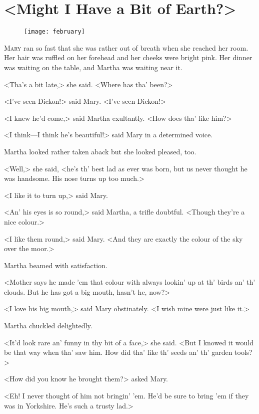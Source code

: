 \chapter{<Might I Have a Bit of Earth?>} 
	
\begin{figure}[t!]
\centering
\texttt{[image: february]}
\end{figure}

 \lettrine[]{M}{ary} ran so fast that she was rather out of breath when she reached her room. Her hair was ruffled on her forehead and her cheeks were bright pink. Her dinner was waiting on the table, and Martha was waiting near it.

\zz
<Tha's a bit late,> she said. <Where has tha' been?>

\zz
<I've seen Dickon!> said Mary. <I've seen Dickon!>

<I knew he'd come,> said Martha exultantly. <How does tha' like him?>

<I think—I think he's beautiful!> said Mary in a determined voice.

Martha looked rather taken aback but she looked pleased, too.

<Well,> she said, <he's th' best lad as ever was born, but us never thought he was handsome. His nose turns up too much.>

<I like it to turn up,> said Mary.

<An' his eyes is so round,> said Martha, a trifle doubtful. <Though they're a nice colour.>

<I like them round,> said Mary. <And they are exactly the colour of the sky over the moor.>

Martha beamed with satisfaction.

<Mother says he made 'em that colour with always lookin' up at th' birds an' th' clouds. But he has got a big mouth, hasn't he, now?>

<I love his big mouth,> said Mary obstinately. <I wish mine were just like it.>

Martha chuckled delightedly.

<It'd look rare an' funny in thy bit of a face,> she said. <But I knowed it would be that way when tha' saw him. How did tha' like th' seeds an' th' garden tools?>

<How did you know he brought them?> asked Mary.

<Eh! I never thought of him not bringin' 'em. He'd be sure to bring 'em if they was in Yorkshire. He's such a trusty lad.>

